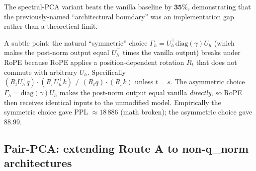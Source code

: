 \documentclass[11pt]{article}
\begin{document}
The spectral-PCA variant beats the vanilla baseline by $\mathbf{35\%}$, demonstrating that the previously-named ``architectural boundary'' was an implementation gap rather than a theoretical limit.

A subtle point: the natural ``symmetric'' choice $\Gamma_h = U_h^\top \mathrm{diag}(\gamma) U_h$ (which makes the post-norm output equal $U_h^\top$ times the vanilla output) breaks under RoPE because RoPE applies a position-dependent rotation $R_t$ that does not commute with arbitrary $U_h$. Specifically $(R_t U_h^\top q)\!\cdot\!(R_s U_h^\top k) \neq (R_t q)\!\cdot\!(R_s k)$ unless $t=s$. The asymmetric choice $\Gamma_h = \mathrm{diag}(\gamma) U_h$ makes the post-norm output equal vanilla \emph{directly}, so RoPE then receives identical inputs to the unmodified model. Empirically the symmetric choice gave PPL $\approx 18\,886$ (math broken); the asymmetric choice gave 88.99.

\subsection{Pair-PCA: extending Route A to non-q\_norm architectures}
\end{document}
